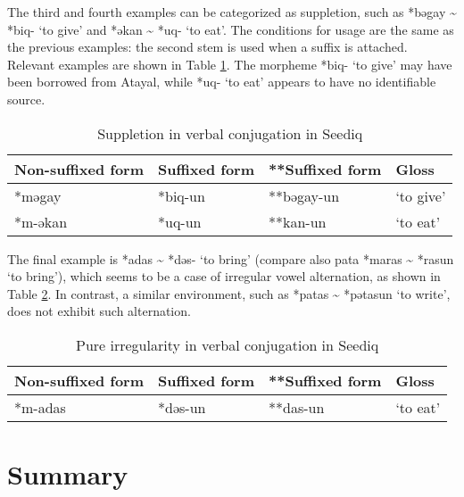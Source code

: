 The third and fourth examples can be categorized as suppletion, such as *bəgay \~{} *biq- `to give' and *əkan \~{} *uq- `to eat'. The conditions for usage are the same as the previous examples: the second stem is used when a suffix is attached. Relevant examples are shown in Table \ref{tab:psed_supp}. The morpheme *biq- `to give' may have been borrowed from Atayal, while *uq- `to eat' appears to have no identifiable source.

\begin{table}[!htbp]
\centering
\caption{Suppletion in verbal conjugation in Seediq}
\label{tab:psed_supp}
\begin{tabular}{llll}
\hline
Non-suffixed form & Suffixed form & **Suffixed form & Gloss     \\ \hline
*məgay            & *biq-un       & **bəgay-un      & `to give' \\
*m-əkan           & *uq-un        & **kan-un        & `to eat'  \\ \hline
\end{tabular}
\end{table}

The final example is *adas \~{} *dəs- `to bring' (compare also \acl{pata} *maras \~{} *rasun `to bring'), which seems to be a case of irregular vowel alternation, as shown in Table \ref{tab:psed_v_irr}. In contrast, a similar environment, such as *patas \~{} *pətasun `to write', does not exhibit such alternation.

\begin{table}[!htbp]
\centering
\caption{Pure irregularity in verbal conjugation in Seediq}
\label{tab:psed_v_irr}
\begin{tabular}{llll}
\hline
Non-suffixed form & Suffixed form & **Suffixed form & Gloss     \\ \hline
*m-adas           & *dəs-un       & **das-un        & `to eat'  \\ \hline
\end{tabular}
\end{table}

\section{Summary}




